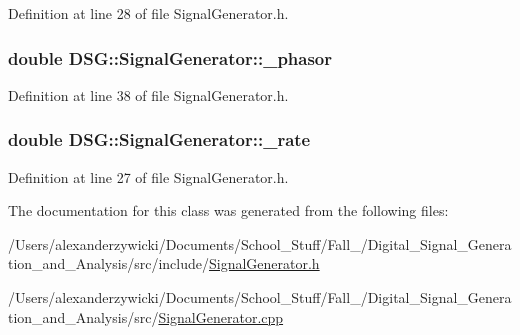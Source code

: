 Definition at line 28 of file Signal\+Generator.\+h.

\hypertarget{classDSG_1_1SignalGenerator_ac2271b582bf699275f077ecb642a8cd9}{
\subsubsection[{\+\_\+phasor}]{\setlength{\rightskip}{0pt plus 5cm}double D\+S\+G\+::\+Signal\+Generator\+::\+\_\+phasor\hspace{0.3cm}{\ttfamily [protected]}}}\label{classDSG_1_1SignalGenerator_ac2271b582bf699275f077ecb642a8cd9}


Definition at line 38 of file Signal\+Generator.\+h.

\hypertarget{classDSG_1_1SignalGenerator_aa10f6c85d9adee901139ea7fb346f39d}{
\subsubsection[{\+\_\+rate}]{\setlength{\rightskip}{0pt plus 5cm}double D\+S\+G\+::\+Signal\+Generator\+::\+\_\+rate\hspace{0.3cm}{\ttfamily [protected]}}}\label{classDSG_1_1SignalGenerator_aa10f6c85d9adee901139ea7fb346f39d}


Definition at line 27 of file Signal\+Generator.\+h.



The documentation for this class was generated from the following files\+:\begin{DoxyCompactItemize}
\item 
/\+Users/alexanderzywicki/\+Documents/\+School\+\_\+\+Stuff/\+Fall\+\_/\+Digital\+\_\+\+Signal\+\_\+\+Generation\+\_\+and\+\_\+\+Analysis/src/include/\hyperlink{SignalGenerator_8h}{Signal\+Generator.\+h}\item 
/\+Users/alexanderzywicki/\+Documents/\+School\+\_\+\+Stuff/\+Fall\+\_/\+Digital\+\_\+\+Signal\+\_\+\+Generation\+\_\+and\+\_\+\+Analysis/src/\hyperlink{SignalGenerator_8cpp}{Signal\+Generator.\+cpp}\end{DoxyCompactItemize}
